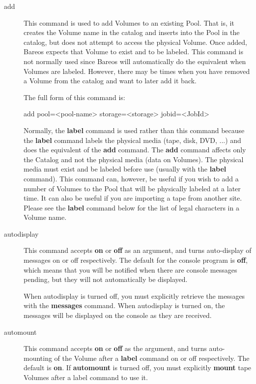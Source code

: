 \begin{description}
\item [add]
   This command is used to add Volumes to an existing Pool.  That is,
   it creates the Volume name in the catalog and inserts into the Pool
   in the catalog, but does not attempt to access the physical Volume.
   Once added, Bareos expects that Volume to exist and to be labeled.
   This command is not normally used since Bareos will
   automatically do the equivalent when Volumes are labeled. However,
   there may be times when you have removed a Volume from the catalog
   and want to later add it back.

   The full form of this command is:

add {\textlbrack}pool={\textless}pool-name{\textgreater} storage={\textless}storage{\textgreater}
  jobid={\textless}JobId{\textgreater}{\textrbrack}

   Normally, the {\bf label} command is used rather than this command
   because the {\bf label} command labels the physical media (tape, disk,
   DVD, ...) and does the equivalent of the {\bf add} command.  The {\bf
   add} command affects only the Catalog and not the physical media (data
   on Volumes).  The physical media must exist and be labeled before use
   (usually with the {\bf label} command).  This command can, however, be
   useful if you wish to add a number of Volumes to the Pool that will be
   physically labeled at a later time.  It can also be useful if you are
   importing a tape from another site.  Please see the {\bf label} command
   below for the list of legal characters in a Volume name.

\item [autodisplay]
   This command accepts {\bf on} or {\bf off} as an argument, and turns
   auto-display of messages on or off respectively.  The default for the
   console program is {\bf off}, which means that you will be notified when
   there are console messages pending, but they will not automatically be
   displayed.

   When autodisplay is turned off, you must explicitly retrieve the
   messages with the {\bf messages} command.  When autodisplay is turned
   on, the messages will be displayed on the console as they are received.

\item [automount]
   This command accepts {\bf on} or {\bf off} as the argument, and turns
   auto-mounting of the Volume after a {\bf label} command on or off
   respectively.  The default is {\bf on}.  If {\bf automount} is turned
   off, you must explicitly {\bf mount} tape Volumes after a label command to
   use it.


\end{description}
